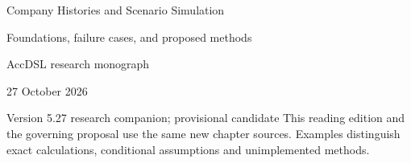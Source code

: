\documentclass[11pt,a4paper]{report}
\begin{document}
\hypersetup{pageanchor=false}
\begin{titlepage}
{\Huge Company Histories and Scenario Simulation\par}
\vspace{12mm}
{\Large Foundations, failure cases, and proposed methods\par}
\vspace{8mm}
AccDSL research monograph\par 27 October 2026\par Version 5.27 research companion; provisional candidate
\vfill
This reading edition and the governing proposal use the same new chapter sources. Examples distinguish exact calculations, conditional assumptions and unimplemented methods.
\end{titlepage}
\hypersetup{pageanchor=true}
\tableofcontents
\clearpage{}


























\clearpage\label{sim:body-end}

\begingroup\raggedright
\endgroup
\end{document}
